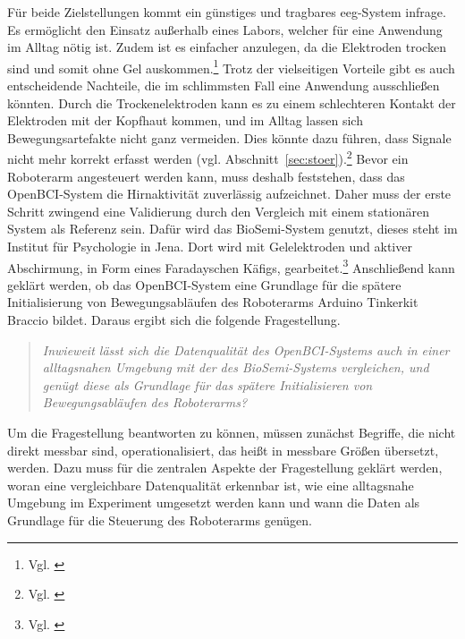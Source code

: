 Für beide Zielstellungen kommt ein günstiges und tragbares \acrshort{eeg}-System infrage. Es ermöglicht den Einsatz außerhalb eines Labors, welcher für eine Anwendung im Alltag nötig ist. Zudem ist es einfacher anzulegen, da die Elektroden trocken sind und somit ohne Gel auskommen.\footnote{Vgl. \cite{openbci_dry_electrodes}} Trotz der vielseitigen Vorteile gibt es auch entscheidende Nachteile, die im schlimmsten Fall eine Anwendung ausschließen könnten. Durch die Trockenelektroden kann es zu einem schlechteren Kontakt der Elektroden mit der Kopfhaut kommen, und im Alltag lassen sich Bewegungsartefakte nicht ganz vermeiden. Dies könnte dazu führen, dass Signale nicht mehr korrekt erfasst werden (vgl. Abschnitt~\ref{sec:stoer}).\footnote{Vgl. \cite[S.~900]{kappenman2010}} Bevor ein Roboterarm angesteuert werden kann, muss deshalb feststehen, dass das OpenBCI-System die Hirnaktivität zuverlässig aufzeichnet. Daher muss der erste Schritt zwingend eine Validierung durch den Vergleich mit einem stationären System als Referenz sein. Dafür wird das BioSemi-System genutzt, dieses steht im Institut für Psychologie in Jena. Dort wird mit Gelelektroden und aktiver Abschirmung, in Form eines Faradayschen Käfigs, gearbeitet.\footnote{Vgl. \cite{biosemi_active_electrodes}} Anschließend kann geklärt werden, ob das OpenBCI-System eine Grundlage für die spätere Initialisierung von Bewegungsabläufen des Roboterarms \glqq Arduino Tinkerkit Braccio\grqq{} bildet. Daraus ergibt sich die folgende Fragestellung.

\begin{quote}
\textit{Inwieweit lässt sich die Datenqualität des OpenBCI-Systems auch in einer alltagsnahen Umgebung mit der des BioSemi-Systems vergleichen, und genügt diese als Grundlage für das spätere Initialisieren von Bewegungsabläufen des Roboterarms?}
\end{quote}

Um die Fragestellung beantworten zu können, müssen zunächst Begriffe, die nicht direkt messbar sind, operationalisiert, das heißt in messbare Größen übersetzt, werden. Dazu muss für die zentralen Aspekte der Fragestellung geklärt werden, woran eine vergleichbare Datenqualität erkennbar ist, wie eine alltagsnahe Umgebung im Experiment umgesetzt werden kann und wann die Daten als Grundlage für die Steuerung des Roboterarms genügen.

